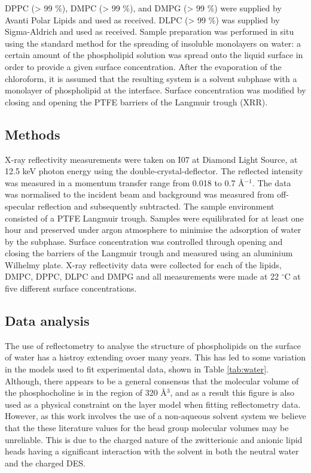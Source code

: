 \documentclass[twoside,twocolumn,9pt]{article}
\begin{document}
DPPC (> 99 \%), DMPC (> 99 \%), and DMPG (> 99 \%) were supplied by Avanti Polar Lipids and used as received. DLPC (> 99 \%) was supplied by Sigma-Aldrich and used as received. Sample preparation was performed in situ using the standard method for the spreading of insoluble monolayers on water: a certain amount of the phospholipid solution was spread onto the liquid surface in order to provide a given surface concentration. After the evaporation of the chloroform, it is assumed that the resulting system is a solvent subphase with a monolayer of phospholipid at the interface. Surface concentration was modified by closing and opening the PTFE barriers of the Langmuir trough (XRR).

\subsection{Methods}
X-ray reflectivity measurements were taken on I07 at Diamond Light Source, at 12.5 keV photon energy using the double-crystal-deflector.\cite{Arnold2012} The reflected intensity was measured in a momentum transfer range from 0.018 to 0.7 \AA$^{-1}$. The data was normalised to the incident beam and background was measured from off-specular reflection and subsequently subtracted. The sample environment consisted of a PTFE Langmuir trough. Samples were equilibrated for at least one hour and preserved under argon atmosphere to minimise the adsorption of water by the subphase. Surface concentration was controlled through opening and closing the barriers of the Langmuir trough and measured using an aluminium Wilhelmy plate. X-ray reflectivity data were collected for each of the lipids, DMPC, DPPC, DLPC and DMPG and all measurements were made at 22 $^\circ$C at five different surface concentrations. 

\subsection{Data analysis}
The use of reflectometry to analyse the structure of phospholipids on the surface of water has a histroy extending ovoer many years.\cite{Mohwald1990,Kewalramani2010,Bayerl1990,Johnson1991,Clifton2012,Helm1987,Daillant1990} This has led to some variation in the models used to fit experimental data, shown in Table \ref{tab:water}. Although, there appears to be a general consensus that the molecular volume of the phosphocholine is in the region of 320 \AA$^3$, and as a result this figure is also used as a physical constraint on the layer model when fitting reflectometry data. However, as this work involves the use of a non-aqueous solvent system we believe that the these literature values for the head group molecular volumes may be unreliable. This is due to the charged nature of the zwitterionic and anionic lipid heads having a significant interaction with the solvent in both the neutral water and the charged DES. 
\end{document}
